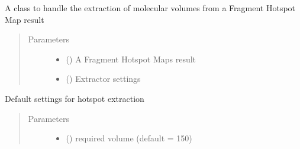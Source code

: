\documentclass[letterpaper,10pt,english]{sphinxmanual}
\begin{document}
\begin{fulllineitems}
\label{\detokenize{result_api:hotspots.result.Extractor}}
A class to handle the extraction of molecular volumes from a Fragment Hotspot Map result
\begin{quote}\begin{description}
\item[{Parameters}] \leavevmode\begin{itemize}
\item {} 
 () \textendash{} A Fragment Hotspot Maps result

\item {} 
 () \textendash{} Extractor settings

\end{itemize}

\end{description}\end{quote}

\begin{fulllineitems}
\label{\detokenize{result_api:hotspots.result.Extractor.Settings}}
Default settings for hotspot extraction
\begin{quote}\begin{description}
\item[{Parameters}] \leavevmode\begin{itemize}
\item {} 
 () \textendash{} required volume (default = 150)


\end{itemize}
\end{description}
\end{quote}
\end{fulllineitems}
\end{fulllineitems}
\end{document}
